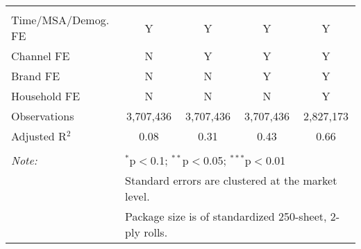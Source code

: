 \begin{table}[!htbp]
\begin{tabular}{@{\extracolsep{5pt}}lcccc}
 \hline \\[-1.8ex] 
Time/MSA/Demog. FE & Y & Y & Y & Y \\ 
Channel FE & N & Y & Y & Y \\ 
Brand FE & N & N & Y & Y \\ 
Household FE & N & N & N & Y \\ 
Observations & 3,707,436 & 3,707,436 & 3,707,436 & 2,827,173 \\ 
Adjusted R$^{2}$ & 0.08 & 0.31 & 0.43 & 0.66 \\ 
\hline 
\hline \\[-1.8ex] 
\textit{Note:}  & \multicolumn{4}{l}{$^{*}$p$<$0.1; $^{**}$p$<$0.05; $^{***}$p$<$0.01} \\ 
 & \multicolumn{4}{l}{Standard errors are clustered at the market level.} \\ 
 & \multicolumn{4}{l}{Package size is of standardized 250-sheet, 2-ply rolls.} \\ 
\end{tabular} 
\end{table} 
